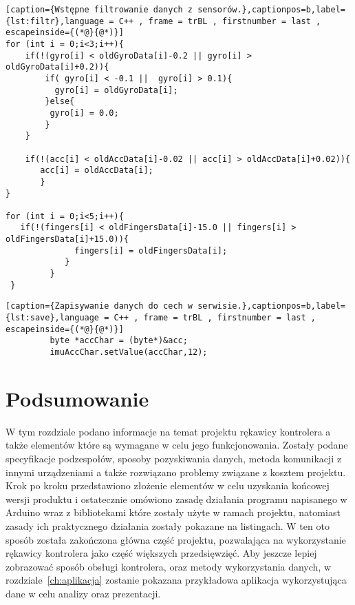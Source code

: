 \begin{lstlisting}[caption={Wstępne filtrowanie danych z sensorów.},captionpos=b,label={lst:filtr},language = C++ , frame = trBL , firstnumber = last , escapeinside={(*@}{@*)}]
for (int i = 0;i<3;i++){
	if(!(gyro[i] < oldGyroData[i]-0.2 || gyro[i] > oldGyroData[i]+0.2)){
		if( gyro[i] < -0.1 ||  gyro[i] > 0.1){              
	      gyro[i] = oldGyroData[i];
	    }else{
	     gyro[i] = 0.0;
	    }
	}
	            
	if(!(acc[i] < oldAccData[i]-0.02 || acc[i] > oldAccData[i]+0.02)){
	   acc[i] = oldAccData[i];
	   }
}

for (int i = 0;i<5;i++){
   if(!(fingers[i] < oldFingersData[i]-15.0 || fingers[i] > oldFingersData[i]+15.0)){
              fingers[i] = oldFingersData[i];
            }
         }         
 }
\end{lstlisting}

\begin{lstlisting}[caption={Zapisywanie danych do cech w serwisie.},captionpos=b,label={lst:save},language = C++ , frame = trBL , firstnumber = last , escapeinside={(*@}{@*)}]
         byte *accChar = (byte*)&acc;
         imuAccChar.setValue(accChar,12);
\end{lstlisting}

\section{Podsumowanie}
\label{sec:summary}
W tym rozdziale podano informacje na temat projektu rękawicy kontrolera a także elementów które są wymagane w celu jego funkcjonowania. Zostały podane specyfikacje podzespołów, sposoby pozyskiwania danych, metoda komunikacji z innymi urządzeniami a także rozwiązano problemy związane z kosztem projektu. Krok po kroku przedstawiono złożenie elementów w celu uzyskania końcowej wersji produktu i ostatecznie omówiono zasadę działania programu napisanego w Arduino wraz z bibliotekami które zostały użyte w ramach projektu, natomiast zasady ich praktycznego działania zostały pokazane na listingach. W ten oto sposób została zakończona główna część projektu, pozwalająca na wykorzystanie rękawicy kontrolera jako część większych przedsięwzięć. Aby jeszcze lepiej zobrazować sposób obsługi kontrolera, oraz metody wykorzystania danych, w rozdziale~\ref{ch:aplikacja} zostanie pokazana przykładowa aplikacja wykorzystująca dane w celu analizy oraz prezentacji. 
